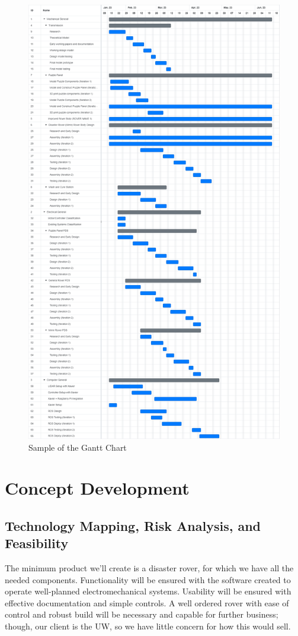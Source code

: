 \documentclass[a4paper, 10pt]{article}
\begin{document}
	\begin{figure} [!h]
		\centering
		\includegraphics[scale=0.2]{Photos/Gantt Chart}
		\caption{Sample of the Gantt Chart}
		\label{gantt_chart}
	\end{figure}

\pagebreak

\section{Concept Development}
	\subsection{Technology Mapping, Risk Analysis, and Feasibility}
	The minimum product we'll create is a disaster rover, for which we have all the needed components. Functionality will be ensured with the software created to operate well-planned electromechanical systems. Usability will be ensured with effective documentation and simple controls. A well ordered rover with ease of control and robust build will be necessary and capable for further business; though, our client is the UW, so we have little concern for how this would  sell.
	
\end{document}
